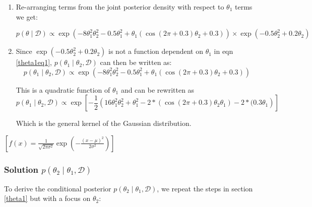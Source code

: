 \documentclass[12pt]{article}
\begin{document}
\begin{enumerate}
\item Re-arranging terms from the joint posterior density with respect to $\theta_1$ terms we get:

\begin{equation}\label{theta1eq1}
p(\theta \mid \mathcal{D}) \propto \exp \left( -8\theta_1^2\theta_2^2 - 0.5\theta_1^2 + \theta_1(\cos(2\pi + 0.3)\theta_2 + 0.3) \right) \times \exp \left( -0.5\theta_2^2 + 0.2\theta_2 \right)  
\end{equation} 
\item Since  $\exp \left( -0.5\theta_2^2 + 0.2\theta_2 \right)$  is not a function dependent on $\theta_1$ in eqn  \ref{theta1eq1}, $p(\theta_1 \mid \theta_2 ,\mathcal{D}) $ can then be written as:
 \begin{equation}\label{theta1eq2}
p(\theta_1 \mid \theta_2 ,\mathcal{D}) \propto \exp \left( -8\theta_1^2\theta_2^2 - 0.5\theta_1^2 + \theta_1(\cos(2\pi + 0.3)\theta_2 + 0.3) \right)
\end{equation} 

This is a quadratic function of $\theta_1$ and can be rewritten as   \begin{equation}\label{theta1eq3}
p(\theta_1 \mid \theta_2 ,\mathcal{D}) \propto \exp\left[- \frac{1}{2}\left( 16\theta_1^2\theta_2^2 + \theta_1^2 - 2*(\cos(2\pi + 0.3)\theta_2 \theta_1) - 2*(0.3\theta_1 \right)\right]
\end{equation} 

Which is the general kernel of the Gaussian distribution. 
\end{enumerate}

$[ f(x) = \frac{1}{\sqrt{2\pi\sigma^2}} \exp\left(-\frac{(x - \mu)^2}{2\sigma^2}\right) ]$


\subsubsection{Solution \(p(\theta_2 \mid \theta_1, \mathcal{D})\) }
To derive the conditional posterior \(p(\theta_2 \mid \theta_1, \mathcal{D})\), we repeat the steps in section \ref{theta1} but with a focus on $\theta_2$:
\end{document}
